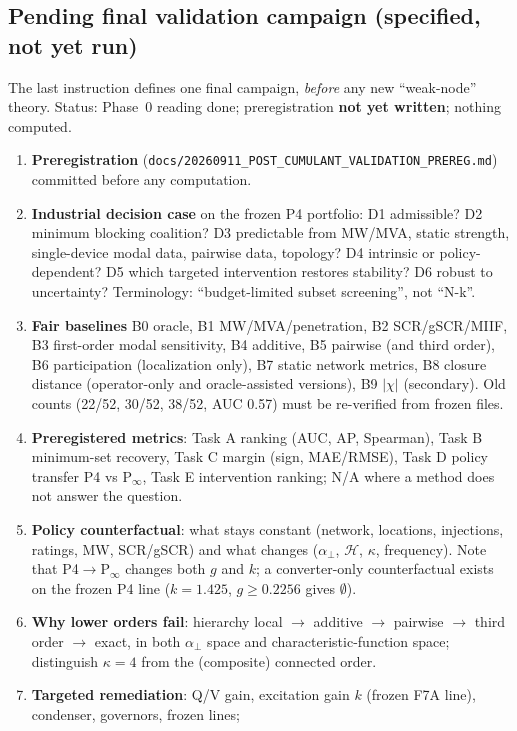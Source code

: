 \documentclass[10pt,a4paper]{article}
\theoremstyle{definition}
\newcommand{\Hy}{\mathcal{H}}
\newcommand{\aperp}{\alpha_\perp}
\begin{document}
\subsection{Pending final validation campaign (specified, not yet run)}
The last instruction defines one final campaign, \emph{before} any new ``weak-node'' theory. Status:
Phase~0 reading done; preregistration \textbf{not yet written}; nothing computed.
\begin{enumerate}
\item \textbf{Preregistration} (\nolinkurl{docs/20260911_POST_CUMULANT_VALIDATION_PREREG.md}) committed before any computation.
\item \textbf{Industrial decision case} on the frozen P4 portfolio: D1 admissible? D2 minimum blocking coalition?
D3 predictable from MW/MVA, static strength, single-device modal data, pairwise data, topology? D4 intrinsic or
policy-dependent? D5 which targeted intervention restores stability? D6 robust to uncertainty?
Terminology: ``budget-limited subset screening'', not ``N-k''.
\item \textbf{Fair baselines} B0 oracle, B1 MW/MVA/penetration, B2 SCR/gSCR/MIIF, B3 first-order modal sensitivity,
B4 additive, B5 pairwise (and third order), B6 participation (localization only), B7 static network metrics,
B8 closure distance (operator-only and oracle-assisted versions), B9 $|\chi|$ (secondary). Old counts
(22/52, 30/52, 38/52, AUC 0.57) must be re-verified from frozen files.
\item \textbf{Preregistered metrics}: Task A ranking (AUC, AP, Spearman), Task B minimum-set recovery, Task C
margin (sign, MAE/RMSE), Task D policy transfer P4 vs P$_\infty$, Task E intervention ranking; N/A where a method
does not answer the question.
\item \textbf{Policy counterfactual}: what stays constant (network, locations, injections, ratings, MW, SCR/gSCR) and
what changes ($\aperp$, $\Hy$, $\kappa$, frequency). Note that P4$\to$P$_\infty$ changes both $g$ and $k$; a
converter-only counterfactual exists on the frozen P4 line ($k=1.425$, $g\ge0.2256$ gives $\emptyset$).
\item \textbf{Why lower orders fail}: hierarchy local $\to$ additive $\to$ pairwise $\to$ third order $\to$ exact, in both
$\aperp$ space and characteristic-function space; distinguish $\kappa=4$ from the (composite) connected order.
\item \textbf{Targeted remediation}: Q/V gain, excitation gain $k$ (frozen F7A line), condenser, governors, frozen lines;

\end{enumerate}
\end{document}
